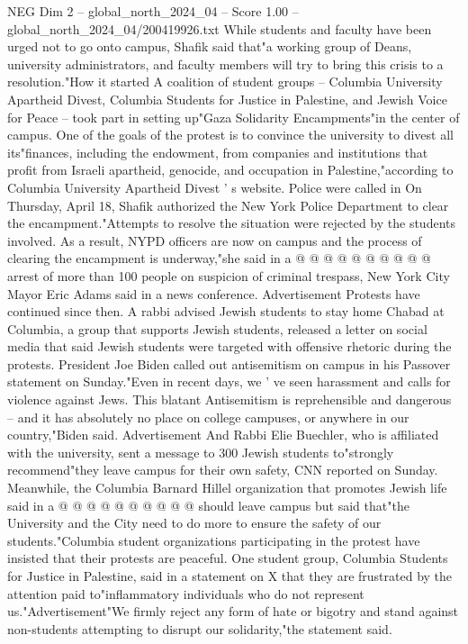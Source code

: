 \begin{textsample}{NEG Dim 2 – global\_north\_2024\_04 – Score 1.00 – global\_north\_2024\_04/200419926.txt}  \label{ex:f2_neg_283}
While students and faculty have been urged not to go onto campus, Shafik said that"a working group of Deans, university administrators, and faculty members will try to bring this crisis to a resolution."How it started A coalition of student groups -- Columbia University Apartheid Divest, Columbia Students for Justice in Palestine, and Jewish Voice for Peace -- took part in setting up"Gaza Solidarity Encampments"in the center of campus.
One of the goals of the protest is to convince the university to divest all its"finances, including the endowment, from companies and institutions that profit from Israeli apartheid, genocide, and occupation in Palestine,"according to Columbia University Apartheid Divest ' s website.
Police were called in On Thursday, April 18, Shafik authorized the New York Police Department to clear the encampment."Attempts to resolve the situation were rejected by the students involved.
As a result, NYPD officers are now on campus and the process of clearing the encampment is underway,"she said in a @ @ @ @ @ @ @ @ @ @ arrest of more than 100 people on suspicion of criminal trespass, New York City Mayor Eric Adams said in a news conference.
Advertisement Protests have continued since then.
A rabbi advised Jewish students to stay home Chabad at Columbia, a group that supports Jewish students, released a letter on social media that said Jewish students were targeted with offensive rhetoric during the protests.
President Joe Biden called out antisemitism on campus in his Passover statement on Sunday."Even in recent days, we ' ve seen harassment and calls for violence against Jews.
This blatant Antisemitism is reprehensible and dangerous -- and it has absolutely no place on college campuses, or anywhere in our country,"Biden said.
Advertisement And Rabbi Elie Buechler, who is affiliated with the university, sent a message to 300 Jewish students to"strongly recommend"they leave campus for their own safety, CNN reported on Sunday.
Meanwhile, the Columbia Barnard Hillel organization that promotes Jewish life said in a @ @ @ @ @ @ @ @ @ @ should leave campus but said that"the University and the City need to do more to ensure the safety of our students."Columbia student organizations participating in the protest have insisted that their protests are peaceful.
One student group, Columbia Students for Justice in Palestine, said in a statement on X that they are frustrated by the attention paid to"inflammatory individuals who do not represent us."Advertisement"We firmly reject any form of hate or bigotry and stand against non-students attempting to disrupt our solidarity,"the statement said.

\end{textsample}
